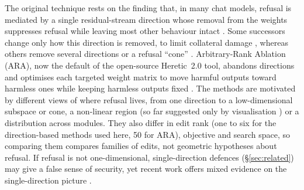 The original technique rests on the finding that, in many chat models,
refusal is mediated by a single residual-stream direction whose removal from
the weights suppresses refusal while leaving most other behaviour intact
\cite{arditi2024refusal}. Some successors change only how this direction is
removed, to limit collateral damage \cite{lai2025mpoa}, whereas others remove
several directions or a refusal ``cone''
\cite{piras2025som,wollschlager2025geometry}. Arbitrary-Rank Ablation (ARA),
now the default of the open-source Heretic~2.0 tool,
abandons directions and optimises each targeted weight matrix to move harmful
outputs toward harmless ones while keeping harmless outputs fixed
\cite{weidmann2026ara}. The methods are motivated by different views of where
refusal lives, from one direction to a low-dimensional subspace or cone, a
non-linear region (so far suggested only by visualisation
\cite{hildebrandt2025refusal}) or a distribution across modules. They also
differ in edit rank (one to six for the direction-based methods used here, 50
for ARA), objective and search space, so comparing them compares families of
edits, not geometric hypotheses about refusal.
If refusal is not one-dimensional, single-direction
defences (\S\ref{sec:related}) may give a false sense of security, yet recent
work offers mixed evidence on the single-direction picture
\cite{joad2026there,wang2026on,pan2025hidden}.


